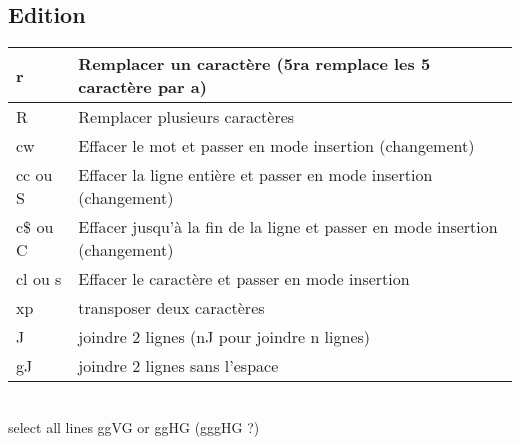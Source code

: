 \documentclass{article}
\begin{document}
                            \subsection{Edition}
                            \begin{tabular}{|p{3cm}| l| }
                                \hline
                                r & Remplacer un caractère (5ra remplace les 5 caractère par a)\\ \hline
                                R & Remplacer plusieurs caractères\\ \hline
                                cw & Effacer le mot et passer en mode insertion (changement)\\ \hline
                                cc ou S & Effacer la ligne entière et passer en mode insertion (changement)\\ \hline
                                c\$ ou C & Effacer jusqu'à la fin de la ligne et passer en mode insertion (changement)\\ \hline
                                cl ou s & Effacer le caractère et passer en mode insertion \\ \hline
                                xp & transposer deux caractères\\ \hline
                                J & joindre 2 lignes (nJ pour joindre n lignes)\\ \hline
                                gJ &joindre 2 lignes sans l'espace\\ \hline
                            \end{tabular}\\

                            select all lines ggVG or ggHG (gggHG ?)
\end{document}
